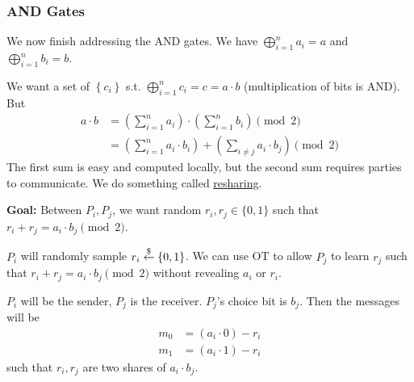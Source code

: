 \subsubsection{AND Gates}
We now finish addressing the \textsf{AND} gates. We have $\bigoplus^n_{i=1}a_i = a$ and $\bigoplus^n_{i=1}b_i = b$.

We want a set of $\left\{ c_i \right\}$ s.t. $\bigoplus^n_{i=1}c_i = c = a \cdot b$ (multiplication of bits is \textsf{AND}). But
\begin{align*}
    a\cdot b
     & = \left( \sum^n_{i=1}a_i \right)\cdot \left( \sum^n_{i=1}b_i \right)\pmod{2}                \\
     & = \left( \sum^n_{i=1}a_i \cdot b_i \right) + \left( \sum_{i\neq j}a_i \cdot b_j \right)\pmod{2}
\end{align*}
The first sum is easy and computed locally, but the second sum requires parties to communicate. We do something called \ul{resharing}.

\textbf{Goal:} Between $P_i, P_j$, we want random $r_i, r_j\in\{0, 1\}$ such that $r_i + r_j = a_i \cdot b_j \pmod{2}$.

$P_i$ will randomly sample $r_i\overset{\$}{\leftarrow} \left\{ 0, 1 \right\}$. We can use OT to allow $P_j$ to learn $r_j$ such that $r_i + r_j = a_i\cdot b_j\pmod{2}$ without revealing $a_i$ or $r_i$.

$P_i$ will be the sender, $P_j$ is the receiver. $P_j$'s choice bit is $b_j$. Then the messages will be
\begin{align*}
    m_0 & = (a_i\cdot 0) - r_i \\
    m_1 & = (a_i\cdot 1) - r_i
\end{align*}
such that $r_i, r_j$ are two shares of $a_i\cdot b_j$.

